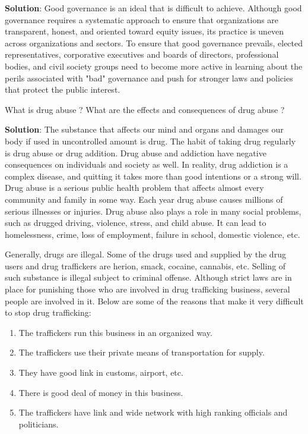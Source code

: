 \documentclass[
]{book}
\newcommand{\question}{\item}
\newenvironment{solution}{ {\bfseries Solution}:}{}
\begin{document}
\begin{questions}
\begin{solution}
Good governance is an ideal that is difficult to achieve. Although good governance requires a systematic approach to ensure that organizations are transparent, honest, and oriented toward equity issues, its practice is uneven across organizations and sectors. To ensure that good governance prevails, elected representatives, corporative executives and boards of directors, professional bodies, and civil society groups need to become more active in learning about the perils associated with "bad" governance and push for stronger laws and policies that protect the public interest.

\end{solution}

\question What is drug abuse ? What are the effects and consequences of drug abuse ?

\begin{solution}
The substance that affects our mind and organs and damages our body if used in uncontrolled amount is drug. The habit of taking drug regularly is drug abuse or drug addition. Drug abuse and addiction have negative consequences on individuals and society as well. In reality, drug addiction is a complex disease, and quitting it takes more than good intentions or a strong will. Drug abuse is a serious public health problem that affects almost every community and family in some way. Each year drug abuse causes millions of serious illnesses or injuries. Drug abuse also plays a role in many social problems, such as drugged driving, violence, stress, and child abuse. It can lead to homelessness, crime, loss of employment, failure in school, domestic violence, etc.

Generally, drugs are illegal. Some of the drugs used and supplied by the drug users and drug traffickers are herion, smack, cocaine, cannabis, etc. Selling of such substance is illegal subject to criminal offense. Although strict laws are in place for punishing those who are involved in drug trafficking business, several people are involved in it. Below are some of the reasons that make it very difficult to stop drug trafficking:

\begin{enumerate}
\item The traffickers run this business in an organized way.
\item The traffickers use their private means of transportation for supply.
\item They have good link in customs, airport, etc.
\item There is good deal of money in this business.
\item The traffickers have link and wide network with high ranking officials and politicians.
\end{enumerate}


\end{solution}
\end{questions}
\end{document}
